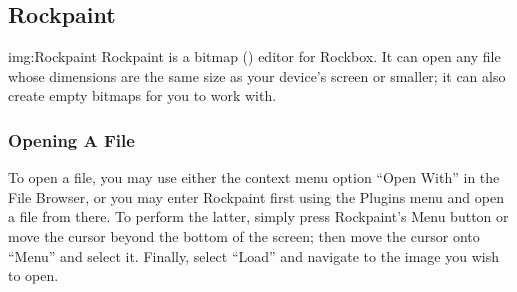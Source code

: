 \subsection{Rockpaint}
%
{img:Rockpaint}
Rockpaint is a bitmap () editor for Rockbox. It can open any  file
whose dimensions are the same size as your device's screen or smaller; it can
also create empty bitmaps for you to work with.\\

\subsubsection{Opening A File}
To open a file, you may use either the context menu option ``Open With'' in the
File Browser, or you may enter Rockpaint first using the Plugins menu and open
a file from there. To perform the latter, simply press Rockpaint's Menu button
or move the cursor beyond the bottom of the screen; then move the cursor onto
``Menu'' and select it. Finally, select ``Load'' and navigate to the image you
wish to open.\\

